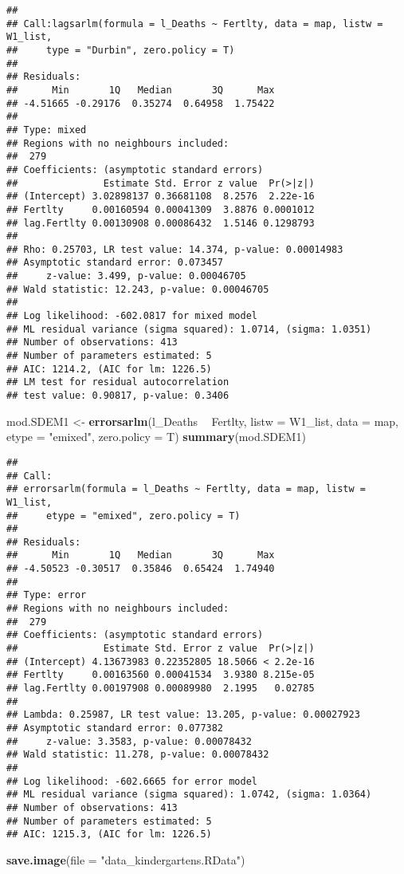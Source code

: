 \documentclass[]{article}
\newenvironment{Shaded}{\begin{snugshade}}{\end{snugshade}}
\newcommand{\KeywordTok}[1]{\textcolor[rgb]{0.13,0.29,0.53}{\textbf{#1}}}
\newcommand{\DataTypeTok}[1]{\textcolor[rgb]{0.13,0.29,0.53}{#1}}
\newcommand{\StringTok}[1]{\textcolor[rgb]{0.31,0.60,0.02}{#1}}
\newcommand{\OperatorTok}[1]{\textcolor[rgb]{0.81,0.36,0.00}{\textbf{#1}}}
\newcommand{\NormalTok}[1]{#1}
\begin{document}
\begin{verbatim}
## 
## Call:lagsarlm(formula = l_Deaths ~ Fertlty, data = map, listw = W1_list, 
##     type = "Durbin", zero.policy = T)
## 
## Residuals:
##      Min       1Q   Median       3Q      Max 
## -4.51665 -0.29176  0.35274  0.64958  1.75422 
## 
## Type: mixed 
## Regions with no neighbours included:
##  279 
## Coefficients: (asymptotic standard errors) 
##               Estimate Std. Error z value  Pr(>|z|)
## (Intercept) 3.02898137 0.36681108  8.2576  2.22e-16
## Fertlty     0.00160594 0.00041309  3.8876 0.0001012
## lag.Fertlty 0.00130908 0.00086432  1.5146 0.1298793
## 
## Rho: 0.25703, LR test value: 14.374, p-value: 0.00014983
## Asymptotic standard error: 0.073457
##     z-value: 3.499, p-value: 0.00046705
## Wald statistic: 12.243, p-value: 0.00046705
## 
## Log likelihood: -602.0817 for mixed model
## ML residual variance (sigma squared): 1.0714, (sigma: 1.0351)
## Number of observations: 413 
## Number of parameters estimated: 5 
## AIC: 1214.2, (AIC for lm: 1226.5)
## LM test for residual autocorrelation
## test value: 0.90817, p-value: 0.3406
\end{verbatim}

\begin{Shaded}
\begin{Highlighting}[]
\NormalTok{mod.SDEM1 <-}\StringTok{ }\KeywordTok{errorsarlm}\NormalTok{(l_Deaths }\OperatorTok{~}\StringTok{ }\NormalTok{Fertlty, }\DataTypeTok{listw =}\NormalTok{ W1_list, }\DataTypeTok{data =}\NormalTok{ map, }\DataTypeTok{etype =} \StringTok{"emixed"}\NormalTok{, }\DataTypeTok{zero.policy =}\NormalTok{ T)}
\KeywordTok{summary}\NormalTok{(mod.SDEM1)}
\end{Highlighting}
\end{Shaded}

\begin{verbatim}
## 
## Call:
## errorsarlm(formula = l_Deaths ~ Fertlty, data = map, listw = W1_list, 
##     etype = "emixed", zero.policy = T)
## 
## Residuals:
##      Min       1Q   Median       3Q      Max 
## -4.50523 -0.30517  0.35846  0.65424  1.74940 
## 
## Type: error 
## Regions with no neighbours included:
##  279 
## Coefficients: (asymptotic standard errors) 
##               Estimate Std. Error z value  Pr(>|z|)
## (Intercept) 4.13673983 0.22352805 18.5066 < 2.2e-16
## Fertlty     0.00163560 0.00041534  3.9380 8.215e-05
## lag.Fertlty 0.00197908 0.00089980  2.1995   0.02785
## 
## Lambda: 0.25987, LR test value: 13.205, p-value: 0.00027923
## Asymptotic standard error: 0.077382
##     z-value: 3.3583, p-value: 0.00078432
## Wald statistic: 11.278, p-value: 0.00078432
## 
## Log likelihood: -602.6665 for error model
## ML residual variance (sigma squared): 1.0742, (sigma: 1.0364)
## Number of observations: 413 
## Number of parameters estimated: 5 
## AIC: 1215.3, (AIC for lm: 1226.5)
\end{verbatim}

\begin{Shaded}
\begin{Highlighting}[]
\KeywordTok{save.image}\NormalTok{(}\DataTypeTok{file =} \StringTok{"data_kindergartens.RData"}\NormalTok{)}
\end{Highlighting}
\end{Shaded}
\end{document}
